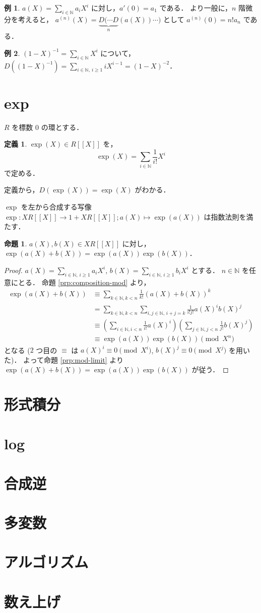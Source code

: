 \documentclass{jsarticle}
\newcommand{\N}{\mathbb{N}}
\newcommand{\longto}{\longrightarrow}
\theoremstyle{definition}
\newtheorem*{Dfn}{定義}
\newtheorem*{Exm}{例}
\newtheorem{Prp}{命題}
\newenvironment{dfn}{\vspace{1ex}\begin{screen}\begin{Dfn}}{\end{Dfn}\end{screen}\vspace{1ex}}
\newenvironment{exm}{\begin{leftbar}\begin{Exm}}{\end{Exm}\end{leftbar}}
\newenvironment{prp}{\vspace{1ex}\begin{screen}\begin{Prp}}{\end{Prp}\end{screen}}
\newenvironment{prf}{\begin{leftbar}\begin{proof}}{\end{proof}\end{leftbar}}
\begin{document}
\begin{exm}
  $a(X) = \sum_{i\in\N} a_i X^i$ に対し，$a'(0) = a_1$ である．
  より一般に，$n$ 階微分を考えると，
  $a^{(n)}(X) = \underbrace{D(\cdots D}_n (a(X)) \cdots)$ として $a^{(n)}(0) = n! a_n$ である．
\end{exm}

\begin{exm}
  $(1 - X)^{-1} = \sum_{i\in\N} X^i$ について，
  $D((1 - X)^{-1}) = \sum_{i\in\N,\,i\ge 1} i X^{i-1} = (1 - X)^{-2}$．
\end{exm}


\section{exp}
$R$ を標数 $0$ の環とする．

\begin{dfn}
  $\exp(X) \in R[[X]]$ を，
  \[
    \exp(X) = \sum_{i\in\N} \frac{1}{i!} X^i
  \]
  で定める．
\end{dfn}

定義から，$D(\exp(X)) = \exp(X)$ がわかる．

$\exp$ を左から合成する写像 $\exp\colon X R[[X]] \longto 1 + X R[[X]]; a(X) \longmapsto \exp(a(X))$ は指数法則を満たす．

\begin{prp}
  $a(X), b(X) \in X R[[X]]$ に対し，$\exp(a(X) + b(X)) = \exp(a(X)) \exp(b(X))$．
\end{prp}
\begin{prf}
  $a(X) = \sum_{i\in\N,\,i\ge 1} a_i X^i$, $b(X) = \sum_{i\in\N,\,i\ge 1} b_i X^i$ とする．
  $n \in \N$ を任意にとる．
  命題 \ref{prp:composition-mod} より，
  \begin{align*}
    \exp(a(X) + b(X))
    &\equiv \sum_{k\in\N,k<n} \frac{1}{k!} (a(X) + b(X))^k \\
    &= \sum_{k\in\N,k<n} \sum_{i,j\in\N,\,i+j=k} \frac{1}{i! j!} a(X)^i b(X)^j \\
    &\equiv \left(\sum_{i\in\N,i<n} \frac{1}{i!} a(X)^i\right) \left(\sum_{j\in\N,j<n} \frac{1}{j!} b(X)^j\right) \\
    &\equiv \exp(a(X)) \exp(b(X))
    \pmod{X^n}
  \end{align*}
  となる ($2$ つ目の $\equiv$ は $a(X)^i \equiv 0 \pmod{X^i}$, $b(X)^j \equiv 0 \pmod{X^j}$ を用いた)．
  よって命題 \ref{prp:mod-limit} より $\exp(a(X) + b(X)) = \exp(a(X)) \exp(b(X))$ が従う．
\end{prf}


\section{形式積分}
\section{log}
\section{合成逆}
\section{多変数}
\section{アルゴリズム}
\section{数え上げ}
\end{document}
